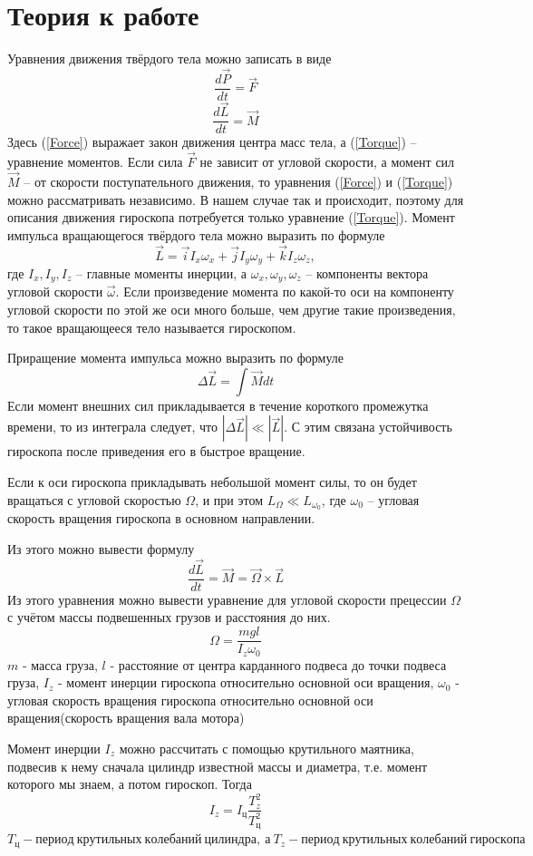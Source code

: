 \documentclass[a4paper, 12pt]{article}
\begin{document}
	\section*{Теория к работе}
		Уравнения движения твёрдого тела можно записать в виде
		\begin{equation}
			\label{Force}
			\frac{d \vec{P}}{dt} = \vec{F}
		\end{equation}
		\begin{equation}
			\label{Torque}
			\frac{d \vec{L}}{dt} = \vec{M}
		\end{equation}
		Здесь (\ref{Force}) выражает закон движения центра масс тела, а (\ref{Torque}) -- уравнение моментов. Если сила $\vec{F}$ не зависит от угловой скорости, а момент сил $\vec{M}$ -- от скорости поступательного движения, то уравнения (\ref{Force}) и (\ref{Torque}) можно рассматривать независимо. В нашем случае так и происходит, поэтому для описания движения гироскопа потребуется только уравнение (\ref{Torque}).
		Момент импульса вращающегося твёрдого тела можно выразить по формуле
		$$\vec{L} = \vec{i} I_x \omega_x + \vec{j} I_y \omega_y  + \vec{k} I_z \omega_z,$$
		где $I_x, I_y, I_z$ -- главные моменты инерции, а $\omega_x, \omega_y, \omega_z$ -- компоненты вектора угловой скорости $\vec{\omega}$. Если произведение момента по какой-то оси на компоненту угловой скорости по этой же оси много больше, чем другие такие произведения, то такое вращающееся тело называется гироскопом.
		\par
		Приращение момента импульса можно выразить по формуле
		$$ \Delta \vec{L} = \int \vec{M} dt$$
		Если момент внешних сил прикладывается в течение короткого промежутка времени, то из интеграла следует, что $|\Delta \vec{L}| \ll |\vec{L}|$. С этим связана устойчивость гироскопа после приведения его в быстрое вращение.
		\par
		Если к оси гироскопа прикладывать небольшой момент силы, то он будет вращаться с угловой скоростью $\Omega$, и при этом $L_\Omega \ll L_{\omega_0}$, где $\omega_0$ -- угловая скорость вращения гироскопа в основном направлении.
		\par
		Из этого можно вывести формулу
		$$ \frac{d \vec{L}}{dt} = \vec{M} = \vec{\Omega} \times \vec{L} $$
		Из этого уравнения можно вывести уравнение для угловой скорости прецессии $\Omega$ с учётом массы подвешенных грузов и расстояния до них.
		$$\Omega = \frac{m g l}{I_z \omega_0}$$
		$m$ - масса груза,
		$l$ - расстояние от центра карданного подвеса до точки подвеса груза,
		$I_z$ - момент инерции гироскопа относительно основной оси вращения,
		$\omega_0$ - угловая скорость вращения гироскопа относительно основной оси вращения(скорость вращения вала мотора)
		\par
		Момент инерции $I_z$ можно рассчитать с помощью крутильного маятника, подвесив к нему сначала цилиндр известной массы и диаметра, т.е. момент которого мы знаем, а потом гироскоп. Тогда
		$$ I_z = I_ц \frac{T_z^2}{T_ц^2} $$
		$T_ц - период\: крутильных\: колебаний\: цилиндра,\: а\: T_z - период\: крутильных\: колебаний\: гироскопа$
\end{document}
